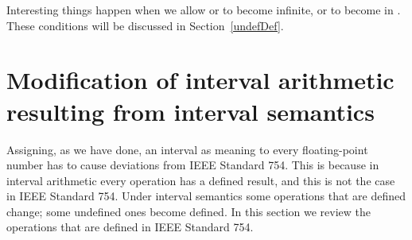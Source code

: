 \documentclass[11pt]{article}
\begin{document}
Interesting things happen when we allow  or  to become infinite,
or  to become  in . These conditions will be discussed in
Section~\ref{undefDef}.

\section{Modification of interval arithmetic resulting from interval
  semantics}\label{mods}

Assigning, as we have done, an interval as meaning to every floating-point
number has to cause deviations from IEEE Standard 754.
This is because in interval arithmetic every operation has a defined
result, and this is not the case in IEEE Standard 754.
Under interval semantics some operations that are defined change;
some undefined ones become defined.
In this section we review the operations that are defined in IEEE
Standard 754.
\end{document}
